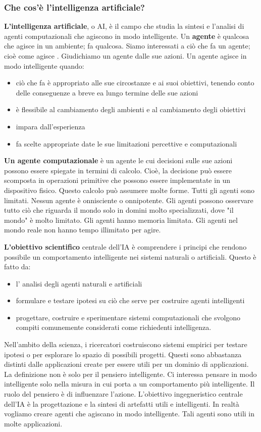 \documentclass[a4paper]{extarticle}
\begin{document}
\subsubsection{Che cos'è l'intelligenza artificiale?}

\textbf{L'intelligenza artificiale}, o AI, è il campo che studia la sintesi e l'analisi di agenti computazionali che agiscono in modo intelligente. Un \textbf{agente} è qualcosa che agisce in un ambiente; fa qualcosa. Siamo interessati a ciò che fa un agente; cioè come agisce . Giudichiamo un agente dalle sue azioni. Un agente agisce in modo intelligente quando:
\begin{itemize}
\item ciò che fa è appropriato alle sue circostanze e ai suoi obiettivi, tenendo conto delle conseguenze a breve ea lungo termine delle sue azioni
\item è flessibile al cambiamento degli ambienti e al cambiamento degli obiettivi
\item impara dall'esperienza
\item fa scelte appropriate date le sue limitazioni percettive e computazionali
\end{itemize}
\textbf{Un agente computazionale} è un agente le cui decisioni sulle sue azioni possono essere spiegate in termini di calcolo. Cioè, la decisione può essere scomposta in operazioni primitive che possono essere implementate in un dispositivo fisico. Questo calcolo può assumere molte forme. Tutti gli agenti sono limitati. Nessun agente è onnisciente o onnipotente. Gli agenti possono osservare tutto ciò che riguarda il mondo solo in domini molto specializzati, dove "il mondo" è molto limitato. Gli agenti hanno memoria limitata. Gli agenti nel mondo reale non hanno tempo illimitato per agire.

\textbf{L'obiettivo scientifico} centrale dell'IA è comprendere i principi che rendono possibile un comportamento intelligente nei sistemi naturali o artificiali. Questo è fatto da:
\begin{itemize}
\item l' analisi degli agenti naturali e artificiali
\item formulare e testare ipotesi su ciò che serve per costruire agenti intelligenti 
\item progettare, costruire e sperimentare sistemi computazionali che svolgono compiti comunemente considerati come richiedenti intelligenza.
\end{itemize}

Nell'ambito della scienza, i ricercatori costruiscono sistemi empirici per testare ipotesi o per esplorare lo spazio di possibili progetti. Questi sono abbastanza distinti dalle applicazioni create per essere utili per un dominio di applicazioni. La definizione non è solo per il pensiero intelligente. Ci interessa pensare in modo intelligente solo nella misura in cui porta a un comportamento più intelligente. Il ruolo del pensiero è di influenzare l'azione. L'obiettivo ingegneristico centrale dell'IA è la progettazione e la sintesi di artefatti utili e intelligenti. In realtà vogliamo creare agenti che agiscano in modo intelligente. Tali agenti sono utili in molte applicazioni.
\end{document}
